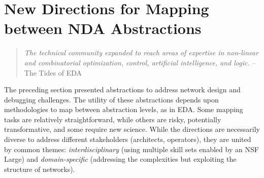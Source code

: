 \section{New Directions for Mapping between NDA Abstractions}
\label{sec:approaches}

\begin{quote}
{\em The technical community expanded to reach areas of expertise in non-linear and combinatorial optimization, control, artificial intelligence, and logic.} -- The Tides of EDA~\cite{alberto}
\vspace{-2mm}
\end{quote}

The preceding section presented abstractions to address network design and debugging challenges. The utility of these abstractions depends upon methodologies to map between abstraction levels, as in EDA. Some mapping tasks are relatively straightforward, while others are risky, potentially transformative, and some require new science. While the directions are necessarily diverse to address different stakeholders (architects, operators), they are united by common themes: {\em interdisciplinary} (using multiple skill sets enabled by an NSF Large) and {\em domain-specific} (addressing the complexities but exploiting the structure of networks).















